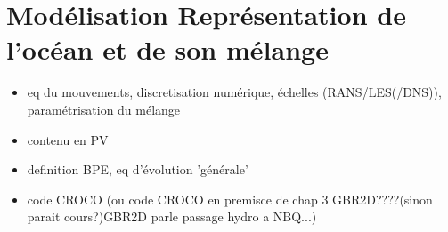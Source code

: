 \documentclass[a4paper,12pt,notitlepage]{report}
\numberwithin{equation}{section}
\begin{document}
\chapter{Mod\'elisation  Repr\'esentation de l'oc\'ean et de son m\'elange}
\begin{itemize}
\item eq du mouvements, discretisation numérique, échelles (RANS/LES(/DNS)), paramétrisation du mélange
\item contenu en PV
\item definition BPE, eq d'évolution 'générale'
\item code CROCO (ou code CROCO en premisce de chap 3 GBR2D????(sinon parait cours?)GBR2D parle passage hydro a NBQ...)
\end{itemize}
\end{document}
